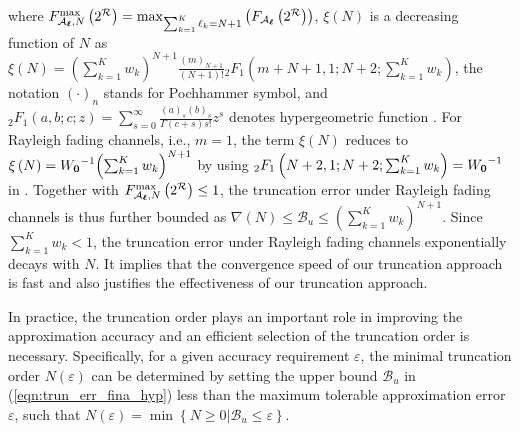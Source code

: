 \documentclass[12pt,onecolumn,draftcls]{IEEEtran}
\newcommand{\bs}{\boldsymbol}
\begin{document}
where ${{F_{{ {\cal A}_{\bs{\ell}}},N}^{\rm max}}\left( 2^{\cal R} \right)} = \mathop {\max }\nolimits_{\sum\nolimits_{k=1}^K  \ell_k = N + 1} \left( {{F_{{ {\cal A}_{\bs{\ell}}}}}\left( 2^{\cal R} \right)} \right)$, ${\xi \left( N \right)}$ is a decreasing function of $N$ as $\xi \left( N \right) ={\left( {\sum\nolimits_{k = 1}^K {{w_k}} } \right)^{N + 1}}\frac{{{{\left( m \right)}_{N + 1}}}}{{\left( {N + 1} \right)!}} {}_2{F_1}\left( {m + N + 1,1;N + 2;\sum\nolimits_{k = 1}^K {{w_k}} } \right)$, the notation $(\cdot)_n$ stands for Pochhammer symbol, and ${}_2F_1(a,b;c;z)=\sum\nolimits_{s = 0}^\infty  {\frac{{{{\left( a \right)}_s}{{\left( b \right)}_s}}}{{\Gamma \left( {c + s} \right)s!}}{z^s}} $ denotes hypergeometric function \cite[Eq.15.1.1]{olver2010nist}. For Rayleigh fading channels, i.e., $m=1$, the term $\xi \left( N \right)$ reduces to $\xi \left( N \right) = {W_{\bf{0}}}^{ - 1}{\left( {\sum\nolimits_{k = 1}^K {{w_k}} } \right)^{N + 1}}$ by using ${}_2{F_1}\left( {N + 2,1;N + 2;\sum\nolimits_{k = 1}^K {{w_k}} } \right) = {W_{\bf{0}}}^{ - 1}$ in \cite[Eq.1.40]{mathai2009h}. Together with ${{F_{{ {\cal A}_{\bs{\ell}}},N}^{\rm max}}\left( 2^{\cal R} \right)} \le 1$, the truncation error under Rayleigh fading channels is thus further bounded as $\nabla(N) \le \mathcal B_u \le {\left( {\sum\nolimits_{k = 1}^K {{w_k}} } \right)^{N + 1}}$. Since ${\sum\nolimits_{k = 1}^K {{w_k}} } < 1$, the truncation error under Rayleigh fading channels exponentially decays with $N$. It implies that the convergence speed of our truncation approach is fast and also justifies the effectiveness of our truncation approach.

In practice, the truncation order plays an important role in improving the approximation accuracy and an efficient selection of the truncation order is necessary. Specifically, for a given accuracy requirement $\varepsilon $, the minimal truncation order $N(\varepsilon)$ can be determined by setting the upper bound $\mathcal B_u$ in (\ref{eqn:trun_err_fina_hyp}) less than the maximum tolerable approximation error $\varepsilon $, such that $N(\varepsilon) = \mathop {\min } \left\{\left. N \ge 0 \right| \mathcal B_u \le \varepsilon   \right\}$.
\end{document}
